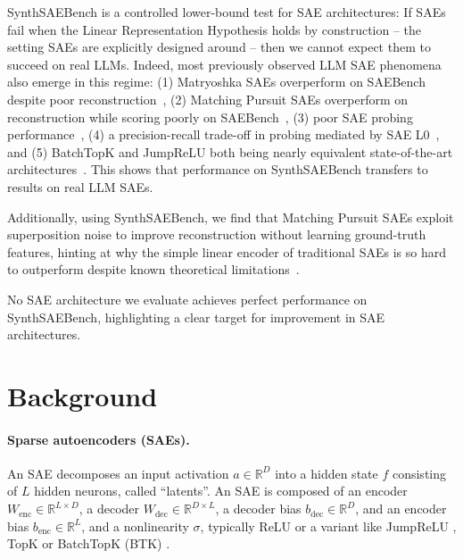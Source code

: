 \documentclass{article}
\theoremstyle{plain}
\theoremstyle{definition}
\theoremstyle{remark}
\newcommand{\enc}{\text{enc}}
\newcommand{\dec}{\text{dec}}
\begin{document}
SynthSAEBench is a controlled lower-bound test for SAE architectures: If SAEs fail when the Linear Representation Hypothesis holds by construction -- the setting SAEs are explicitly designed around -- then we cannot expect them to succeed on real LLMs. Indeed, most previously observed LLM SAE phenomena also emerge in this regime: (1) Matryoshka SAEs overperform on SAEBench despite poor reconstruction~\citep{bussmann2025learning,karvonen2025saebenchcomprehensivebenchmarksparse}, (2) Matching Pursuit SAEs overperform on reconstruction while scoring poorly on SAEBench~\citep{chanin2025trainingmpsaes}, (3) poor SAE probing performance~\citep{kantamneni2025sparse}, (4) a precision-recall trade-off in probing mediated by SAE L0~\citep{chanin2025a}, and (5) BatchTopK and JumpReLU both being nearly equivalent state-of-the-art architectures~\citep{bloom2024saetrainingcodebase,bussmann2024batchtopk,rajamanoharan2024jumping}. This shows that performance on SynthSAEBench transfers to results on real LLM SAEs.

Additionally, using SynthSAEBench, we find that Matching Pursuit SAEs exploit superposition noise to improve reconstruction without learning ground-truth features, hinting at why the simple linear encoder of traditional SAEs is so hard to outperform despite known theoretical limitations~\citep{oneill2025compute}.

No SAE architecture we evaluate achieves perfect performance on SynthSAEBench, highlighting a clear target for improvement in SAE architectures.


\section{Background}

\paragraph{Sparse autoencoders (SAEs).} An SAE decomposes an input activation \(a \in \mathbb{R}^D\) into a hidden state \(f\) consisting of \(L\) hidden neurons, called ``latents''. An SAE is composed of an encoder \(W_\enc \in \mathbb{R}^{L \times D}\), a decoder \(W_\dec \in \mathbb{R}^{D \times L} \), a decoder bias \(b_\dec \in \mathbb{R}^D\), and an encoder bias \(b_\enc \in \mathbb{R}^L\), and a nonlinearity \(\sigma\), typically ReLU or a variant like JumpReLU \citep{rajamanoharan2024jumping}, TopK \citep{gao2024scaling} or BatchTopK (BTK) \citep{bussmann2024batchtopk}.
\end{document}
